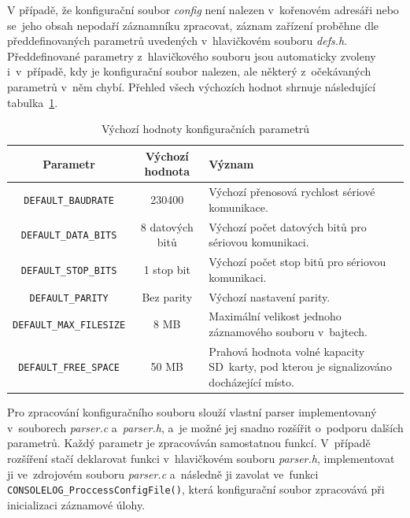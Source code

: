 V případě, že konfigurační soubor \textit{config} není nalezen v~kořenovém adresáři nebo se~jeho obsah nepodaří záznamníku zpracovat, záznam zařízení proběhne dle předdefinovaných parametrů uvedených v~hlavičkovém souboru \textit{defs.h}. Předdefinované parametry z~hlavičkového souboru jsou automaticky zvoleny i~v~případě, kdy je konfigurační soubor nalezen, ale některý z~očekávaných parametrů v~něm chybí. Přehled všech výchozích hodnot shrnuje následující tabulka~\ref{tab:default-parameters}.

\begin{table}[h]
    \centering
    \begin{tabularx}{\textwidth}{|c|c|X|}
        \hline
        \textbf{Parametr} & \textbf{Výchozí hodnota} & \textbf{Význam} \\
        \hline
        \texttt{DEFAULT\_BAUDRATE} & 230400 & Výchozí přenosová rychlost sériové komunikace. \\
        \hline
        \texttt{DEFAULT\_DATA\_BITS} & 8 datových bitů & Výchozí počet datových bitů pro sériovou komunikaci. \\
        \hline
        \texttt{DEFAULT\_STOP\_BITS} & 1 stop bit & Výchozí počet stop bitů pro sériovou komunikaci. \\
        \hline
        \texttt{DEFAULT\_PARITY} & Bez parity & Výchozí nastavení parity. \\
        \hline
        \texttt{DEFAULT\_MAX\_FILESIZE} & 8 MB & Maximální velikost jednoho záznamového souboru v~bajtech. \\
        \hline
        \texttt{DEFAULT\_FREE\_SPACE} & 50 MB & Prahová hodnota volné kapacity SD~karty, pod kterou je signalizováno docházející místo. \\
        \hline
    \end{tabularx}
    \caption{Výchozí hodnoty konfiguračních parametrů}
    \label{tab:default-parameters}
\end{table}

Pro zpracování konfiguračního souboru slouží vlastní parser implementovaný v~souborech \textit{parser.c} a~\textit{parser.h}, a~je možné jej snadno rozšířit o~podporu dalších parametrů. Každý parametr je zpracováván samostatnou funkcí. V~případě rozšíření stačí deklarovat funkci v~hlavičkovém souboru \textit{parser.h}, implementovat ji ve~zdrojovém souboru \textit{parser.c} a~následně ji zavolat ve~funkci \texttt{CONSOLELOG\_ProccessConfigFile()}, která konfigurační soubor zpracovává při inicializaci záznamové úlohy.


